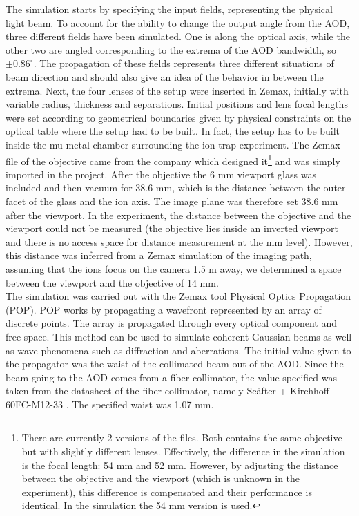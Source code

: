 The simulation starts by specifying the input fields, representing the physical light beam. To account for the ability to change the output angle from the AOD, three different fields have been simulated. One is along the optical axis, while the other two are angled corresponding to the extrema of the AOD bandwidth, so $\pm0.86^{\circ}$. The propagation of these fields represents three different situations of beam direction and should also give an idea of the behavior in between the extrema. Next, the four lenses of the setup were inserted in Zemax, initially with variable radius, thickness and separations. Initial positions and lens focal lengths were set according to geometrical boundaries given by physical constraints on the optical table where the setup had to be built. In fact, the  setup has to be built inside the mu-metal chamber surrounding the ion-trap experiment. The Zemax file of the objective came from the company which designed it\footnote{There are currently 2 versions of the files. Both contains the same objective but with slightly different lenses. Effectively, the difference in the simulation is the focal length: 54 mm and 52 mm. However, by adjusting the distance between the objective and the viewport (which is unknown in the experiment), this difference is compensated and their performance is identical. In the simulation the 54 mm version is used.} and was simply imported in the project. After the objective the 6 mm viewport glass was included and then vacuum for 38.6 mm, which is the distance between the outer facet of the glass and the ion axis. The image plane was therefore set 38.6 mm after the viewport. In the experiment, the distance between the objective and the viewport could not be measured (the objective lies inside an inverted viewport and there is no access space for distance measurement at the mm level). However, this distance was inferred from a Zemax simulation of the imaging path, assuming that the ions focus on the camera 1.5 m away, we determined a space between the viewport and the objective of 14 mm.\\
The simulation was carried out with the Zemax tool Physical Optics Propagation (POP). POP works by propagating a wavefront represented by an array of discrete points. The array is propagated through every optical component and free space. This method can be used to simulate coherent Gaussian beams as well as wave phenomena such as diffraction and aberrations. The initial value given to the propagator was the waist of the collimated beam out of the AOD. Since the beam going to the AOD comes from a fiber collimator, the value specified was taken from the datasheet of the fiber collimator, namely Sc\"after + Kirchhoff 60FC-M12-33 \cite{fibercollimator}. The specified waist was 1.07 mm.
